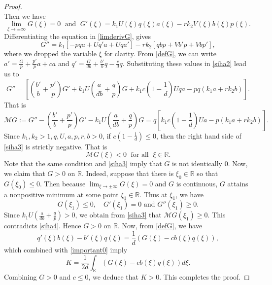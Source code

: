 \documentclass[11pt]{article}
\numberwithin{equation}{section}
\newcommand{\CK}[1]{\color{red}{#1}\color{black}}
\newcommand{\1}{\mathbbm{1}}
\numberwithin{equation}{section}
\theoremstyle{definition}
\def \dis {\displaystyle}
\def \R {\mathbb{R}}
\def \M {\mathcal{M}}
\def \M {\mathcal{M}}
\numberwithin{equation}{section}
\def \dis {\displaystyle}
\begin{document}
\begin{proof}
\begin{equation}
\end{equation} 
Then we have 
\begin{equation}\label{limderivG}
\lim_{\xi\to \pm\infty}G(\xi)=0  \;  \text{ and } \; G'(\xi)= k_1U(\xi)q(\xi)a(\xi)-rk_2V(\xi)b(\xi)p(\xi).
\end{equation}
Differentiating the equation in \eqref{limderivG}, gives
\begin{equation}\label{siha2}
G''=k_1\left[-pqa+ Uq'a+Uqa'\right] -rk_2\left[qbp+Vb'p+Vbp'\right],
\end{equation}
where we dropped the variable $\xi$ for clarity.
From \eqref{defG}, we can write $a'=\frac{G}{p}+\frac{p'}{p}a+ca$ and $q'=\frac{G}{d b}+\frac{b'}{b}q-\frac{c}{d}q$. Substituting these values in \eqref{siha2} lead us to
\begin{equation*}
G''=\left[ \left( \frac{b'}{b}+\frac{p'}{p}\right)G' +k_1U\left( \frac{a}{d b}+\frac{q}{p}\right) G+ k_1c\left(1-\frac{1}{d}\right)Uqa -pq(k_1a+rk_2b)\right].
\end{equation*}
That is 
\begin{equation}\label{siha3}
\M G:=G''-\left( \frac{b'}{b}+\frac{p'}{p}\right)G' -k_1U\left( \frac{a}{d b}+\frac{q}{p}\right) G=q\left[ k_1c\left(1-\frac{1}{d}\right)Ua -p(k_1a+rk_2b)\right].
\end{equation}
Since $k_1,k_2>1, q,U,a,p,r,b>0$,  if $c\left(1-\frac{1}{d}\right)\leq0$, then the right hand side of \eqref{siha3} is strictly negative. %
That is  
\begin{equation}\label{siha4}
\M G(\xi)<0\; \text{ for all }\;  \xi\in \R.
\end{equation}
Note that the same condition  and \eqref{siha3} imply that $G$ is not identically $0$. Now, we claim that $G>0$ on $\R$. Indeed, suppose that there is $\xi_0\in \R$ so that $G(\xi_0)\leq 0$.  Then because  $\dis \lim_{\xi\to \pm\infty}G(\xi)=0$ and $G$ is continuous, $G$ attains a nonpositive minimum at some point $\xi_1 \in \R$. Thus at $\xi_1$, we have 
\begin{equation*}
G(\xi_1)\leq 0, \quad G'(\xi_1)=0 \text{ and } G''(\xi_1)\geq 0.
\end{equation*}
Since $k_1U\left( \frac{a}{d b}+\frac{q}{p}\right)>0$, we obtain from \eqref{siha3} that $\M G(\xi_1)\geq 0$. This contradicts \eqref{siha4}. Hence $G>0$ on $\R$. Now, from \eqref{defG}, we have 
\begin{equation*}
q'(\xi)b(\xi)-b'(\xi)q(\xi)=\frac{1}{d}\left( G(\xi)-cb(\xi)q(\xi)\right),
\end{equation*}
which combined with \eqref{important0} imply 
\begin{equation*}
K= \frac{1}{2d}\int_{\R}\left( G(\xi)-cb(\xi)q(\xi)\right)d\xi. 
\end{equation*}
Combining $G>0$ and $c\leq 0$, we deduce that $K>0$.  This completes the proof.
\end{proof}
\end{document}
